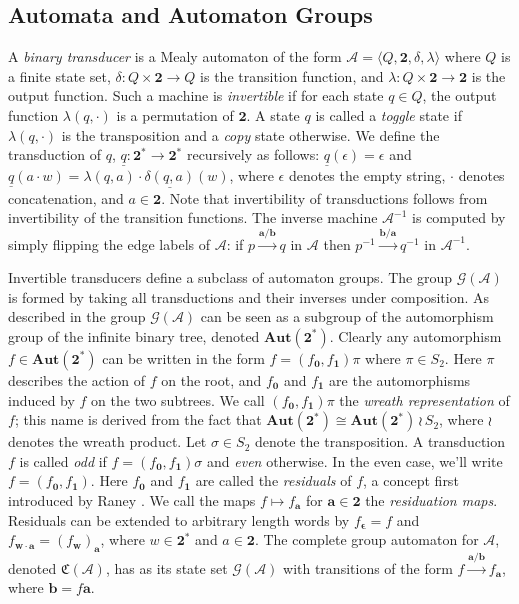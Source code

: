 \documentclass[12pt, letterpaper]{article}
\newcommand{\bin}{\mathbf 2}
\newcommand{\A}{\mathcal A}
\newcommand{\ch}[1]{\mathbf{#1}}
\newcommand{\res}[2]{{{#1}_{\ch{#2}}}}
\newcommand{\comp}{\mathfrak C}
\newcommand{\Aut}{\mathbf{Aut}}
\newcommand{\gp}{\mathcal G}
\begin{document}
\subsection{Automata and Automaton Groups}
A \emph{binary transducer} is a Mealy automaton of the form $\A = \langle Q,
\bin, \delta, \lambda \rangle$ where $Q$ is a finite state set, $\delta: Q
\times \bin \rightarrow Q$ is the transition function, and $\lambda: Q \times
\bin \rightarrow \bin$ is the output function. Such a machine is
\emph{invertible} if for each state $q \in Q$, the output function $\lambda(q,
\cdot)$ is a permutation of $\bin$. A state $q$ is called a \emph{toggle} state
if $\lambda(q, \cdot)$ is the transposition and a \emph{copy} state otherwise.
We define the transduction of $q$, $\underline{q}: \bin^* \rightarrow \bin^*$
recursively as follows: $\underline{q}(\epsilon) = \epsilon$ and
$\underline{q}(a \cdot w) = \lambda(q, a) \cdot \underline{\delta(q, a)}(w)$,
where $\epsilon$ denotes the empty string, $\cdot$ denotes concatenation, and
$a \in \bin$. Note that invertibility of transductions follows from
invertibility of the transition functions.  The inverse machine $\A^{-1}$ is
computed by simply flipping the edge labels of $\A$: if
$p \xrightarrow{\ch{a} / \ch{b}} q$ in $\A$ then
$p^{-1} \xrightarrow{\ch{b} / \ch{a}} q^{-1}$ in $\A^{-1}$.

Invertible transducers define a subclass of automaton groups. The group
$\gp(\A)$ is formed by taking all transductions and their inverses under
composition.  As described in \cite{jalc170214} the group $\gp(\A)$ can be seen
as a subgroup of the automorphism group of the infinite binary tree, denoted
$\Aut(\bin^*)$.  Clearly any automorphism $f \in \Aut(\bin^*)$ can be written
in the form $f = (\res{f}{0}, \res{f}{1})\pi$ where $\pi \in S_2$. Here $\pi$
describes the action of $f$ on the root, and $\res{f}{0}$ and $\res{f}{1}$ are
the automorphisms induced by $f$ on the two subtrees. We call $(\res{f}{0},
\res{f}{1})\pi$ the \emph{wreath representation} of $f$; this name is derived
from the fact that $\Aut(\bin^*) \cong \Aut(\bin^*) \, \wr \, S_2$, where $\wr$
denotes the wreath product. Let $\sigma \in S_2$ denote the transposition. A
transduction $f$ is called \emph{odd} if $f = (\res{f}{0}, \res{f}{1}) \sigma$
and \emph{even} otherwise. In the even case, we'll write $f = (\res{f}{0},
\res{f}{1})$. Here $\res{f}{0}$ and $\res{f}{1}$ are called the
\emph{residuals} of $f$, a concept first introduced by Raney
\cite{raney1958sequential}. We call the maps $f \mapsto \res{f}{a}$ for $\ch{a}
\in \bin$ the \emph{residuation maps}. Residuals can be extended to arbitrary
length words by $\res{f}{\epsilon} = f$ and $\res{f}{w \cdot a} =
\res{(\res{f}{w})}{a}$, where $w \in \bin^*$ and $a \in \bin$. The complete
group automaton for $\A$, denoted $\comp(\A)$, has as its state set $\gp(\A)$
with transitions of the form $f \xrightarrow{\ch{a} / \ch{b}} \res{f}{a}$,
where $\ch{b} = f \ch{a}$.
\end{document}
